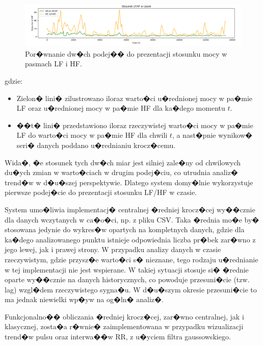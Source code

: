 \begin{figure}
    \centering
    \includegraphics[scale=0.4]{Rysunki/lf_hf_avg_ratio.png}
    \caption{Por�wnanie dw�ch podej�� do prezentacji stosunku mocy w pasmach LF i HF.}
    \label{fig:lf_hf_avg_ratio}
\end{figure}

gdzie:
\begin{itemize}
    \item Zielon� lini� zilustrowano iloraz warto�ci u�rednionej mocy w pa�mie LF oraz
          u�rednionej mocy w pa�mie HF dla ka�dego momentu \( t \).
    \item ��t� lini� przedstawiono iloraz rzeczywistej warto�ci mocy w pa�mie LF do warto�ci mocy w pa�mie HF dla chwili \( t \), a nast�pnie wynikow� seri� danych poddano u�rednianiu krocz�cemu.
\end{itemize}

Wida�, �e stosunek tych dw�ch miar jest silniej zale�ny od chwilowych du�ych
zmian w warto�ciach w drugim podej�ciu, co utrudnia analiz� trend�w w d�u�szej
perspektywie. Dlatego system domy�lnie wykorzystuje pierwsze podej�cie do
prezentacji stosunku LF/HF w czasie.

System umo�liwia implementacj� centralnej �redniej krocz�cej wy��cznie dla
danych wczytanych w ca�o�ci, np. z pliku CSV. Taka �rednia mo�e by� stosowana
jedynie do wykres�w opartych na kompletnych danych, gdzie dla ka�dego
analizowanego punktu istnieje odpowiednia liczba pr�bek zar�wno z jego lewej,
jak i prawej strony. W przypadku analizy danych w czasie rzeczywistym, gdzie
przysz�e warto�ci s� nieznane, tego rodzaju u�rednianie w tej implementacji nie
jest wspierane. W takiej sytuacji stosuje si� �rednie oparte wy��cznie na
danych historycznych, co powoduje przesuni�cie (tzw. lag) wzgl�dem
rzeczywistego sygna�u. W d�u�szym okresie przesuni�cie to ma jednak niewielki
wp�yw na og�ln� analiz�.

Funkcjonalno�� obliczania �redniej krocz�cej, zar�wno centralnej, jak i
klasycznej, zosta�a r�wnie� zaimplementowana w przypadku wizualizacji trend�w
pulsu oraz interwa��w RR, z u�yciem filtra gaussowskiego.

